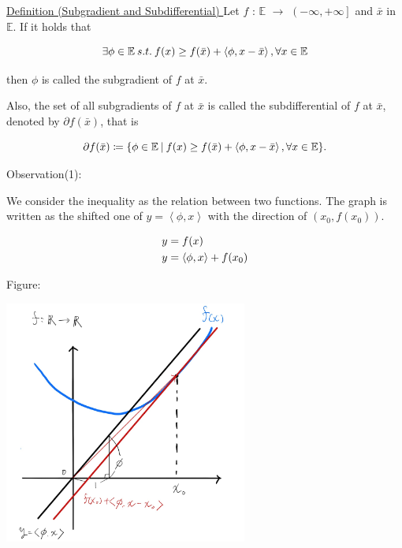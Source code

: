 \documentclass[a4paper,11pt]{jsarticle}
\begin{document}
\begin{itembox}[l]{\underline{Definition (Subgradient and Subdifferential) }}
  Let $f$ : $\mathbb{E}$ $\to$ $ \left ( -\infty ,+\infty \right ] $ and $\bar{x}$ in $\mathbb{E}$. If it holds that

  \begin{equation}
    \exists \phi \in \mathbb{E} \:s.t.\: f(x) \geq f(\bar{x}) + \left\langle \phi, x-\bar{x} \right\rangle, \forall x \in \mathbb{E} \notag
  \end{equation}

  then $\phi$ is called the subgradient of $f$ at $\bar{x}$.

  Also, the set of all subgradients of $f$ at $\bar{x}$ is called the subdifferential of $f$ at $\bar{x}$, denoted by $\partial f(\bar{x})$, that is

  \begin{equation}
    \partial f(\bar{x}) \coloneqq \{\phi \in \mathbb{E}\:|\:f(x) \geq f(\bar{x}) + \left\langle \phi, x-\bar{x} \right\rangle, \forall x \in \mathbb{E} \}. \notag
  \end{equation}
\end{itembox}

Observation(1):

We consider the inequality as the relation between two functions. The  graph is written as the shifted one of $y=\left\langle \phi,x \right\rangle$ with the direction of $(x_0,f(x_0))$.

\begin{equation}
  \begin{split}
    y &= f(x) \\
    y &= \left\langle \phi,x \right\rangle + f(x_0) \notag
  \end{split}
\end{equation}

Figure:

\begin{center}
  \includegraphics[width=8cm]{figures/subgradient_(1).png}
\end{center}
\end{document}
